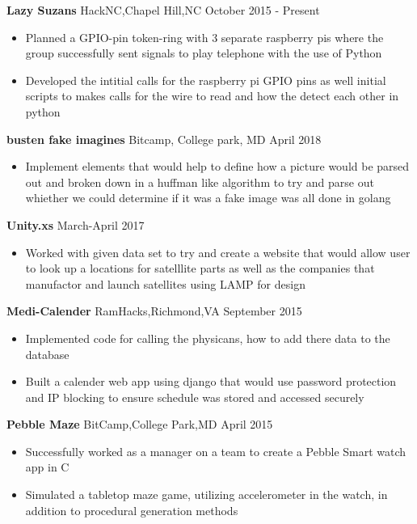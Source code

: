 \documentclass{res}
\begin{document}
\begin{resume}
  \textbf{Lazy Suzans} HackNC,Chapel Hill,NC \hfill  October 2015 - Present
  	\begin{itemize}
	  \item { Planned  a GPIO-pin token-ring with 3 separate raspberry pis where the group successfully sent signals to play telephone with the use of Python}
\vspace{-1pt}
          \item{Developed the intitial calls for the raspberry pi GPIO pins as well initial scripts to makes calls for the wire to read and how the detect each other in python}
  	\end{itemize}
\vspace{-10pt} 
\textbf{busten fake imagines} Bitcamp, College park, MD \hfill April 2018
\begin{itemize}
    \item{Implement elements  that would help to define how a picture would be parsed out and broken down in a huffman like algorithm to try and parse out whiether we could determine if it was a fake image was all done in golang}
\end{itemize}
\vspace{-10pt}
  \textbf{Unity.xs}  \hfill March-April 2017
  \begin{itemize}
       \item {Worked with given data set to try and create a website that would allow user to look up a locations for satelllite parts as well as the companies that manufactor and launch satellites using LAMP for design}
  \end{itemize}
     \vspace{-10pt}
\textbf{Medi-Calender} RamHacks,Richmond,VA \hfill September 2015 
  	\begin{itemize}
	  \item { Implemented code for calling the physicans, how to add there data to the database }
\vspace{-1pt}
		 \item {Built a calender web app using django that would use password protection and IP blocking to ensure schedule was stored and accessed securely} 
\vspace{-1pt}
  	\end{itemize}
\vspace{-10pt}
\textbf{Pebble Maze} BitCamp,College Park,MD \hfill	April 2015
  	\begin{itemize}
  		\item{Successfully worked as a manager on a team to create a Pebble Smart watch app in C}
\vspace{-1pt}
		\item{Simulated a tabletop maze game, utilizing accelerometer in the watch, in addition to procedural  generation methods}
       \end{itemize}
  

\end{resume}
\end{document}

